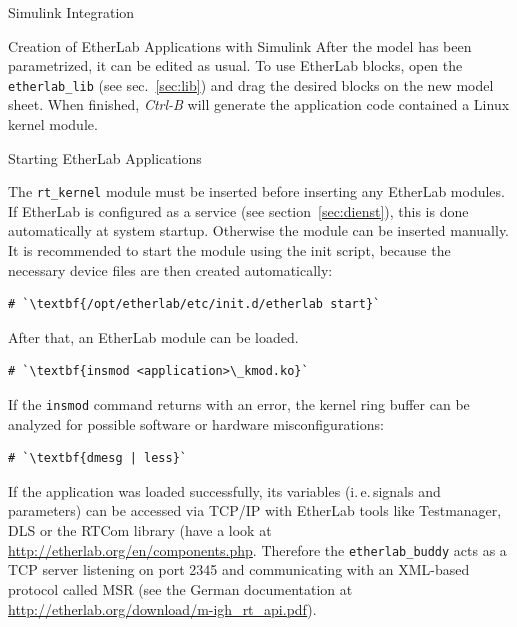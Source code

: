 \begin{ighsec}{Simulink Integration}
\begin{ighsec}{Creation of EtherLab Applications with Simulink}
After the model has been parametrized, it can be edited as usual. To use
EtherLab blocks, open the \texttt{etherlab\_lib} (see sec.~\ref{sec:lib}) and
drag the desired blocks on the new model sheet. When finished, \textit{Ctrl-B}
will generate the application code contained a Linux kernel module.

\end{ighsec}


\end{ighsec} %


\begin{ighsec}{Starting EtherLab Applications}
\label{sec:start}

The \texttt{rt\_kernel} module must be inserted before inserting any EtherLab
modules. If EtherLab is configured as a service (see
section~\ref{sec:dienst}), this is done automatically at system startup.
Otherwise the module can be inserted manually. It is recommended to start the
module using the init script, because the necessary device files are then
created automatically:

\begin{lstlisting}[gobble=2]
  # `\textbf{/opt/etherlab/etc/init.d/etherlab start}`
\end{lstlisting}

After that, an EtherLab module can be loaded.

\begin{lstlisting}[gobble=2]
  # `\textbf{insmod <application>\_kmod.ko}`
\end{lstlisting}

If the \texttt{insmod} command returns with an error, the kernel ring
buffer can be analyzed for possible software or hardware
misconfigurations:

\begin{lstlisting}[gobble=2]
  # `\textbf{dmesg | less}`
\end{lstlisting}

If the application was loaded successfully, its variables (i.\,e.\,signals and
parameters) can be accessed via TCP/IP with EtherLab tools like Testmanager,
DLS or the RTCom library (have a look at
\url{http://etherlab.org/en/components.php}. Therefore the
\texttt{etherlab\_buddy} acts as a TCP server listening on port 2345 and
communicating with an XML-based protocol called MSR (see the German
documentation at \url{http://etherlab.org/download/m-igh_rt_api.pdf}).

\end{ighsec}

